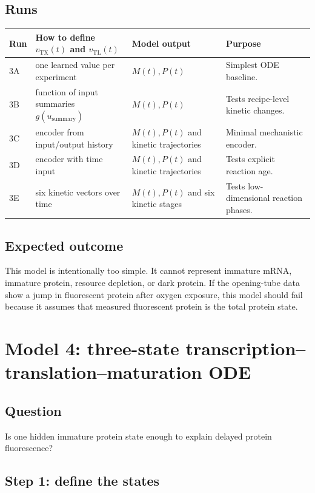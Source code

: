 \documentclass[11pt]{article}
\newcommand{\TX}{\mathrm{TX}}
\newcommand{\TL}{\mathrm{TL}}
\newcommand{\summary}{\mathrm{summary}}
\begin{document}
\subsection{Runs}

\begin{center}
\begin{tabularx}{\textwidth}{lllX}
\toprule
Run & How to define $v_{\TX}(t)$ and $v_{\TL}(t)$ & Model output & Purpose \\
\midrule
3A & one learned value per experiment & $M(t),P(t)$ & Simplest ODE baseline. \\
3B & function of input summaries $g(u_{\summary})$ & $M(t),P(t)$ & Tests recipe-level kinetic changes. \\
3C & encoder from input/output history & $M(t),P(t)$ and kinetic trajectories & Minimal mechanistic encoder. \\
3D & encoder with time input & $M(t),P(t)$ and kinetic trajectories & Tests explicit reaction age. \\
3E & six kinetic vectors over time & $M(t),P(t)$ and six kinetic stages & Tests low-dimensional reaction phases. \\
\bottomrule
\end{tabularx}
\end{center}

\subsection{Expected outcome}

This model is intentionally too simple. It cannot represent immature mRNA, immature protein, resource depletion, or dark protein. If the opening-tube data show a jump in fluorescent protein after oxygen exposure, this model should fail because it assumes that measured fluorescent protein is the total protein state.

\section{Model 4: three-state transcription--translation--maturation ODE}

\subsection{Question}
Is one hidden immature protein state enough to explain delayed protein fluorescence?

\subsection{Step 1: define the states}
\end{document}
